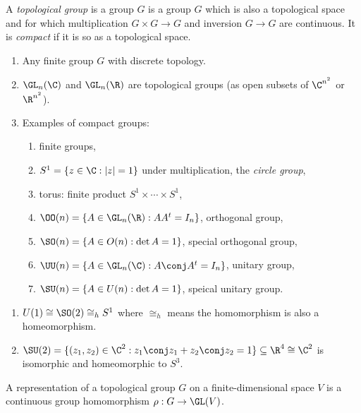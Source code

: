 \documentclass[a4paper]{article}
\theoremstyle{definition}
\begin{document}
\begin{definition}
  A \emph{topological group} is a group \(G\) is a group \(G\) which is also a topological space and for which multiplication \(G \times G \to G\) and inversion \(G \to G\) are continuous. It is \emph{compact} if it is so as a topological space.
\end{definition}

\begin{eg}\leavevmode
  \begin{enumerate}
  \item Any finite group \(G\) with discrete topology.
  \item \(\GL_n(\C)\) and \(\GL_n(\R)\) are topological groups (as open subsets of \(\C^{n^2}\) or \(\R^{n^2}\)).
  \item Examples of compact groups:
    \begin{enumerate}
    \item finite groups,
    \item \(S^1 = \{z \in \C: |z| = 1\}\) under multiplication, the \emph{circle group},
    \item torus: finite product \(S^1 \times \cdots \times S^1\),
    \item \(\OO(n) = \{A \in \GL_n(\R): AA^t = I_n\}\), orthogonal group,
    \item \(\SO(n) = \{A \in O(n): \det A = 1\}\), special orthogonal group,
    \item \(\UU(n) = \{A \in \GL_n(\C): A \conj A^t = I_n\}\), unitary group,
    \item \(\SU(n) = \{A \in U(n): \det A = 1\}\), speical unitary group.
    \end{enumerate}
  \end{enumerate}
\end{eg}

\begin{remark}\leavevmode
  \begin{enumerate}
  \item \(U(1) \cong \SO(2) \cong_h S^1\) where \(\cong_h\) means the homomorphism is also a homeomorphism.
  \item \(\SU(2) = \{(z_1, z_2) \in \C^2: z_1 \conj z_1 + z_2 \conj z_2 = 1\} \subseteq \R^4 \cong \C^2\) is isomorphic and homeomorphic to \(S^3\).
  \end{enumerate}
\end{remark}

\begin{definition}
  A representation of a topological group \(G\) on a finite-dimensional space \(V\) is a continuous group homomorphism \(\rho: G \to \GL(V)\).
\end{definition}
\end{document}
